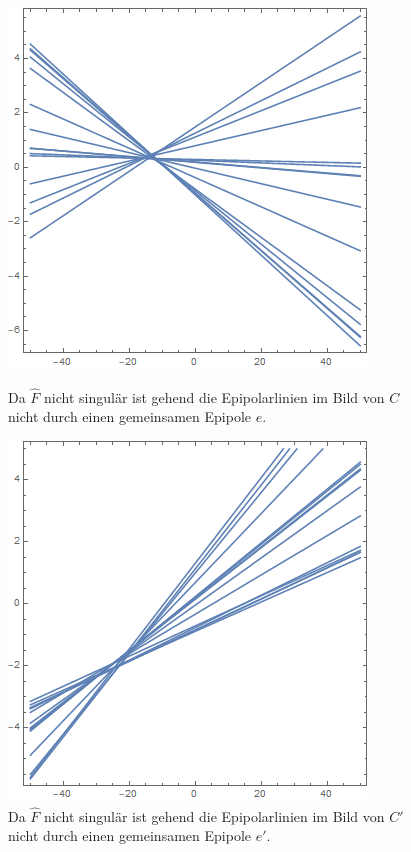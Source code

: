 \begin{figure}[!htb]
	\includegraphics[width=\linewidth]{images/L_F_no_Constraint.png}
	\caption[Epipolarlinien $C$ ohne Singularität]{Da $\hat{F}$ nicht singulär ist gehend die Epipolarlinien im Bild von $C$ nicht durch einen gemeinsamen Epipole $e$.}
	\label{fig:NoEpipoleWithF1}
	\endminipage\hfill
	\includegraphics[width=\linewidth]{images/LPrime_PC2_F_no_Constraint.png}
	\caption[Epipolarlinien $C'$ ohne Singularität]{Da $\hat{F}$ nicht singulär ist gehend die Epipolarlinien im Bild von $C'$ nicht durch einen gemeinsamen Epipole $e'$.}
	\label{fig:NoEpipoleWithF2}
	\endminipage\hfill
\end{figure}

